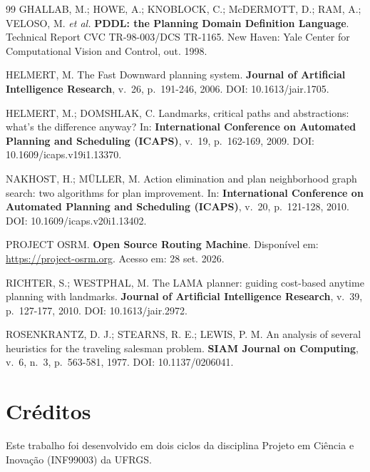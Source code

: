 \documentclass[11pt,a4paper]{article}
\begin{document}
\begin{thebibliography}{99}
GHALLAB, M.; HOWE, A.; KNOBLOCK, C.; McDERMOTT, D.; RAM, A.; VELOSO, M. \textit{et al.} \textbf{PDDL: the Planning Domain Definition Language}. Technical Report CVC TR-98-003/DCS TR-1165. New Haven: Yale Center for Computational Vision and Control, out. 1998.

HELMERT, M. The Fast Downward planning system. \textbf{Journal of Artificial Intelligence Research}, v.~26, p.~191-246, 2006. DOI: 10.1613/jair.1705.

HELMERT, M.; DOMSHLAK, C. Landmarks, critical paths and abstractions: what's the difference anyway? In: \textbf{International Conference on Automated Planning and Scheduling (ICAPS)}, v.~19, p.~162-169, 2009. DOI: 10.1609/icaps.v19i1.13370.

NAKHOST, H.; MÜLLER, M. Action elimination and plan neighborhood graph search: two algorithms for plan improvement. In: \textbf{International Conference on Automated Planning and Scheduling (ICAPS)}, v.~20, p.~121-128, 2010. DOI: 10.1609/icaps.v20i1.13402.

PROJECT OSRM. \textbf{Open Source Routing Machine}. Disponível em: \url{https://project-osrm.org}. Acesso em: 28 set. 2026.

RICHTER, S.; WESTPHAL, M. The LAMA planner: guiding cost-based anytime planning with landmarks. \textbf{Journal of Artificial Intelligence Research}, v.~39, p.~127-177, 2010. DOI: 10.1613/jair.2972.

ROSENKRANTZ, D. J.; STEARNS, R. E.; LEWIS, P. M. An analysis of several heuristics for the traveling salesman problem. \textbf{SIAM Journal on Computing}, v.~6, n.~3, p.~563-581, 1977. DOI: 10.1137/0206041.

\end{thebibliography}

\section*{Créditos}

Este trabalho foi desenvolvido em dois ciclos da disciplina Projeto em Ciência e Inovação (INF99003) da UFRGS.
\end{document}
